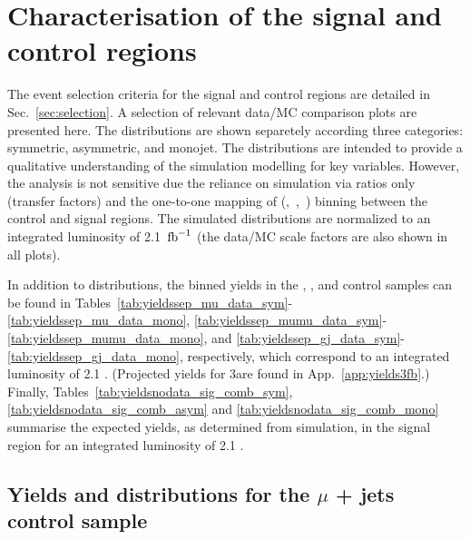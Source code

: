 \section{Characterisation of the signal and control regions}
\label{sec:yields}

The event selection criteria for the signal and control regions are
detailed in Sec.~\ref{sec:selection}. A selection of relevant data/MC
comparison plots are presented here. The distributions are shown
separetely according three \njet categories: symmetric, asymmetric,
and monojet. The distributions are intended to provide a qualitative
understanding of the simulation modelling for key variables. However,
the analysis is not sensitive due the reliance on simulation via
ratios only (\ie transfer factors) and the one-to-one mapping of
(\njet,~\nb,~\scalht) binning between the control and signal
regions. The simulated distributions are normalized to an integrated
luminosity of 2.1~$\ifb$ (the data/MC scale factors are also shown
in all plots).

In addition to distributions, the binned yields in the \mj, \mmj, and
\gj control samples can be found in
Tables~\ref{tab:yieldssep_mu_data_sym}-\ref{tab:yieldssep_mu_data_mono},
\ref{tab:yieldssep_mumu_data_sym}-\ref{tab:yieldssep_mumu_data_mono},
and \ref{tab:yieldssep_gj_data_sym}-\ref{tab:yieldssep_gj_data_mono},
respectively, which correspond to an integrated luminosity of 2.1
\ifb. (Projected yields for 3\ifb are found in
App.~\ref{app:yields3fb}.) Finally,
Tables~\ref{tab:yieldsnodata_sig_comb_sym},
\ref{tab:yieldsnodata_sig_comb_asym} and \ref{tab:yieldsnodata_sig_comb_mono} summarise the expected yields, as
determined from simulation, in the signal region for an integrated
luminosity of 2.1 \ifb.

\clearpage
\subsection{Yields and distributions for the $\mu$ + jets control sample}





